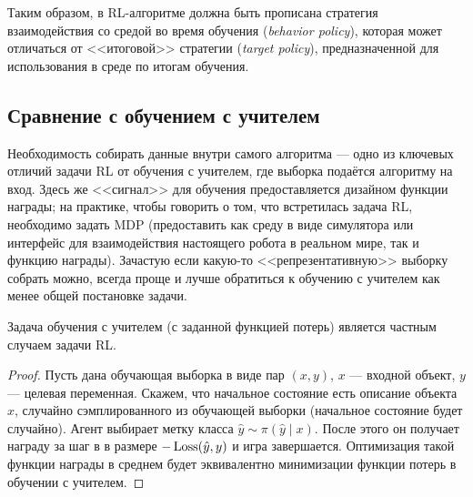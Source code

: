 Таким образом, в RL-алгоритме должна быть прописана стратегия взаимодействия со средой во время обучения (\emph{behavior policy}), которая может отличаться от <<итоговой>> стратегии (\emph{target policy}), предназначенной для использования в среде по итогам обучения. 


\subsection{Сравнение с обучением с учителем}

Необходимость собирать данные внутри самого алгоритма --- одно из ключевых отличий задачи RL от обучения с учителем, где выборка подаётся алгоритму на вход. Здесь же <<сигнал>> для обучения предоставляется дизайном функции награды; на практике, чтобы говорить о том, что встретилась задача RL, необходимо задать MDP (предоставить как среду в виде симулятора или интерфейс для взаимодействия настоящего робота в реальном мире, так и функцию награды). Зачастую если какую-то <<репрезентативную>> выборку собрать можно, всегда проще и лучше обратиться к обучению с учителем как менее общей постановке задачи.  

\begin{proposition}
Задача обучения с учителем (с заданной функцией потерь) является частным случаем задачи RL.
\begin{proof}
Пусть дана обучающая выборка в виде пар $(x, y)$, $x$ --- входной объект, $y$ --- целевая переменная. Скажем, что начальное состояние есть описание объекта $x$, случайно сэмплированного из обучающей выборки (начальное состояние будет случайно). Агент выбирает метку класса $\hat{y} \sim \pi(\hat{y} \mid x)$. После этого он получает награду за шаг в в размере $-\operatorname{Loss}(\hat{y}, y)$ и игра завершается. Оптимизация такой функции награды в среднем будет эквивалентно минимизации функции потерь в обучении с учителем. 
\end{proof}
\end{proposition}

